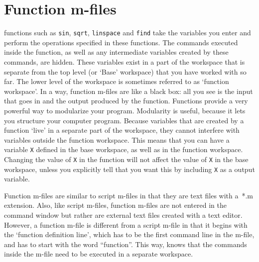 \chapter{Function m-files}
\thispagestyle{fancy}
\label{ch:functions}


\MATLAB{} functions such as {\tt sin}, {\tt sqrt}, {\tt linspace} and {\tt find} take the variables you enter and perform the operations specified in these functions. The commands executed inside the function, as well as any intermediate variables created by these commands, are hidden. These variables exist in a part of the workspace that is separate from the top level (or `Base' workspace) that you have worked with so far. The lower level of the workspace is sometimes referred to as `function workspace'. In a way, function m-files are like a black box: all you see is the input that goes in and the output produced by the function. Functions provide a very powerful way to modularize your program. Modularity is useful, because it lets you structure your computer program. Because variables that are created by a function `live' in a separate part of the workspace, they cannot interfere with variables outside the function workspace. This means that you can have a variable {\tt X} defined in the base workspace, as well as in the function workspace. Changing the value of {\tt X} in the function will not affect the value of {\tt X} in the base workspace, unless you explicitly tell \MATLAB{} that you want this by including {\tt X} as a output variable. 

Function m-files are similar to \MATLAB{} script m-files in that they are text files with a~*.m extension. Also, like script m-files, function m-files are not entered in the command window but rather are external text files created with a text editor. However, a function m-file is different from a script m-file in that it begins with the `function definition line', which has to be the first command line in the m-file, and has to start with the word ``function''. This way, \MATLAB{} knows that the commands inside the m-file need to be executed in a separate workspace. 

